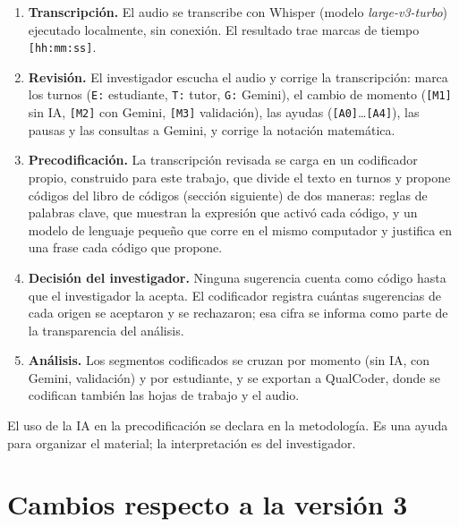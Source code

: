 \documentclass[11pt,letterpaper]{article}
\begin{document}
\begin{enumerate}
  \item \textbf{Transcripción.} El audio se transcribe con Whisper (modelo \emph{large-v3-turbo}) ejecutado localmente, sin conexión. El resultado trae marcas de tiempo \texttt{[hh:mm:ss]}.
  \item \textbf{Revisión.} El investigador escucha el audio y corrige la transcripción: marca los turnos (\texttt{E:} estudiante, \texttt{T:} tutor, \texttt{G:} Gemini), el cambio de momento (\texttt{[M1]} sin IA, \texttt{[M2]} con Gemini, \texttt{[M3]} validación), las ayudas (\texttt{[A0]}\ldots\texttt{[A4]}), las pausas y las consultas a Gemini, y corrige la notación matemática.
  \item \textbf{Precodificación.} La transcripción revisada se carga en un codificador propio, construido para este trabajo, que divide el texto en turnos y propone códigos del libro de códigos (sección siguiente) de dos maneras: reglas de palabras clave, que muestran la expresión que activó cada código, y un modelo de lenguaje pequeño que corre en el mismo computador y justifica en una frase cada código que propone.
  \item \textbf{Decisión del investigador.} Ninguna sugerencia cuenta como código hasta que el investigador la acepta. El codificador registra cuántas sugerencias de cada origen se aceptaron y se rechazaron; esa cifra se informa como parte de la transparencia del análisis.
  \item \textbf{Análisis.} Los segmentos codificados se cruzan por momento (sin IA, con Gemini, validación) y por estudiante, y se exportan a QualCoder, donde se codifican también las hojas de trabajo y el audio.
\end{enumerate}

\noindent El uso de la IA en la precodificación se declara en la metodología. Es una ayuda para organizar el material; la interpretación es del investigador.

\section{Cambios respecto a la versión 3}\label{sec:cambios}
\end{document}

